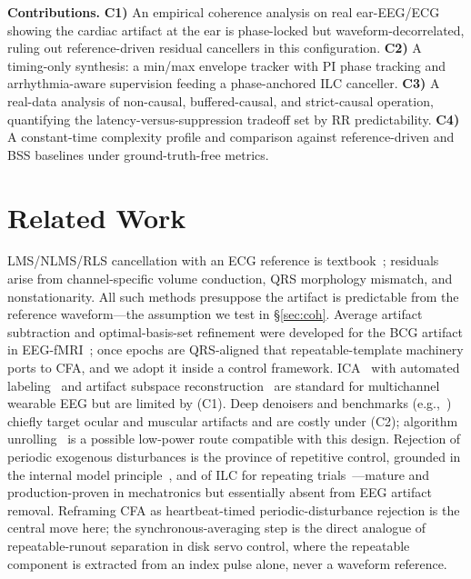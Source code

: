 \documentclass[conference]{IEEEtran}
\begin{document}
\textbf{Contributions.} \textbf{C1)} An empirical coherence analysis on real ear-EEG/ECG showing the
cardiac artifact at the ear is phase-locked but waveform-decorrelated, ruling out reference-driven
residual cancellers in this configuration. \textbf{C2)} A timing-only synthesis: a min/max envelope
tracker with PI phase tracking and arrhythmia-aware supervision feeding a phase-anchored ILC
canceller. \textbf{C3)} A real-data analysis of non-causal, buffered-causal, and strict-causal
operation, quantifying the latency-versus-suppression tradeoff set by RR predictability.
\textbf{C4)} A constant-time complexity profile and comparison against reference-driven and BSS
baselines under ground-truth-free metrics.

\section{Related Work}

LMS/NLMS/RLS cancellation with an ECG reference is
textbook~\cite{widrow1975,haykin2014,sayed2008,diniz2013}; residuals arise from channel-specific
volume conduction, QRS morphology mismatch, and nonstationarity. All such methods presuppose the
artifact is predictable from the reference waveform---the assumption we test in \S\ref{sec:coh}.
Average artifact subtraction and optimal-basis-set refinement were developed for the BCG artifact in
EEG-fMRI~\cite{allen1998,allen2000,niazy2005}; once epochs are QRS-aligned that repeatable-template
machinery ports to CFA, and we adopt it inside a control framework. ICA~\cite{jung2000} with
automated labeling~\cite{pion2019} and artifact subspace reconstruction~\cite{mullen2015} are
standard for multichannel wearable EEG but are limited by (C1). Deep denoisers and benchmarks
(e.g.,~\cite{zhang2021}) chiefly target ocular and muscular artifacts and are costly under (C2);
algorithm unrolling~\cite{gregor2010,monga2021} is a possible low-power route compatible with this
design. Rejection of periodic exogenous disturbances is the province of repetitive control, grounded
in the internal model principle~\cite{francis1976,hara1988,longman2000}, and of ILC for repeating
trials~\cite{arimoto1984,bristow2006}---mature and production-proven in mechatronics but essentially
absent from EEG artifact removal. Reframing CFA as heartbeat-timed periodic-disturbance rejection is
the central move here; the synchronous-averaging step is the direct analogue of repeatable-runout
separation in disk servo control, where the repeatable component is extracted from an index pulse
alone, never a waveform reference.
\end{document}

